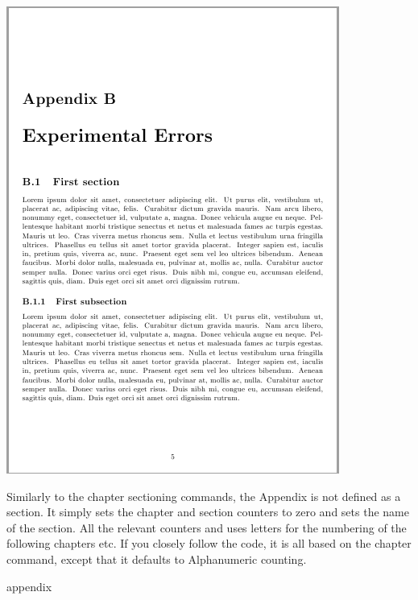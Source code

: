 \includegraphics[width=\linewidth]{./graphics/appendix.png}

Similarly to the chapter sectioning commands, the Appendix is not defined as a section. It simply sets the chapter and section counters to zero and sets the name of the section. All the relevant counters and uses letters for the numbering of the following chapters etc. If you closely follow the code, it is all based on the chapter command, except that it defaults to Alphanumeric counting.

\begin{docCommand}{appendix}{}
\end{docCommand}

\begin{teX}
\newcommand\appendix{\par
  \setcounter{chapter}{0}%
  \setcounter{section}{0}%
  \gdef\@chapapp{\appendixname}(*@\sidenote{The actual literal used for \textbackslash{appendixname} is defined later on, so that you can customize the language}\label{appendixname}@*)
  \gdef\thechapter{\@Alph\c@chapter}}
\end{teX}

